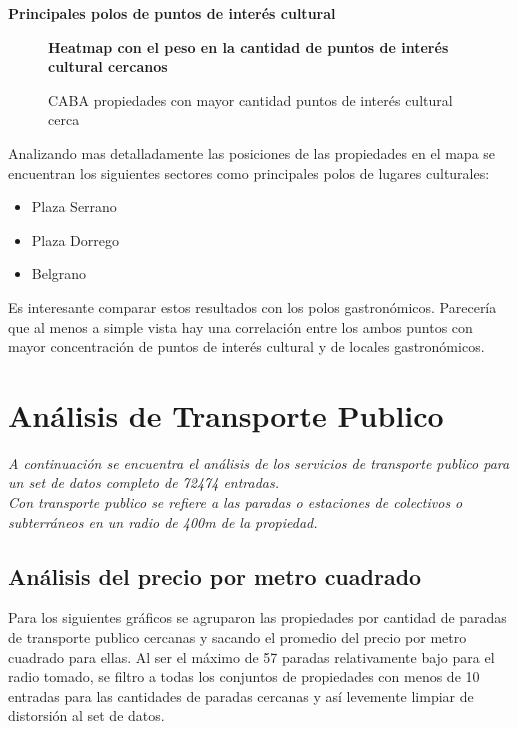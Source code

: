 \documentclass[a4paper, 10pt]{article}
\begin{document}
				\textbf{Principales polos de puntos de interés cultural}
				
				\begin{figure}[H]
    				\centering
    				\textbf{Heatmap con el peso en la cantidad de puntos de interés cultural cercanos}\par\medskip
    				\caption{CABA propiedades con mayor cantidad puntos de interés cultural cerca}
				\end{figure}				
				
				
				Analizando mas detalladamente las posiciones de las propiedades en el mapa se encuentran 
				los siguientes sectores como principales polos de lugares culturales:
				
				\begin{itemize}
					\item Plaza Serrano
					\item Plaza Dorrego
					\item Belgrano
				\end{itemize}

				Es interesante comparar estos resultados con los polos gastronómicos. 
				Parecería que al menos a simple vista hay una correlación entre los 
				ambos puntos con mayor concentración de puntos de interés cultural y de locales gastronómicos. 
		
		\section{Análisis de Transporte Publico}
			\emph{A continuación se encuentra el análisis de los servicios de transporte publico para un 
			set de datos completo de 72474 entradas.\\
			Con transporte publico se refiere a las paradas o estaciones de colectivos o 
			subterráneos en un radio de 400m de la propiedad.} 												
			\subsection{Análisis del precio por metro cuadrado}
				Para los siguientes gráficos se agruparon las propiedades por cantidad de paradas de 
				transporte publico cercanas y sacando el promedio del precio por metro cuadrado para 
				ellas. Al ser el máximo de 57 paradas relativamente bajo para el radio tomado, 
				se filtro a todas los conjuntos de propiedades con menos de 10 entradas para las 
				cantidades de paradas cercanas y así levemente limpiar de distorsión al set de datos.
				 		
\end{document}
